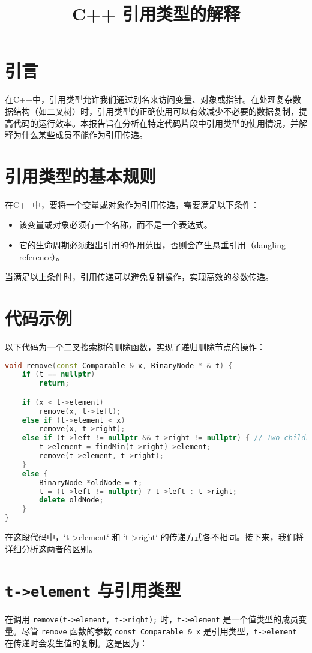 \documentclass{article}
\title{C++ 引用类型的解释}
\author{}
\date{}
\begin{document}
\maketitle

\section{引言}
在C++中，引用类型允许我们通过别名来访问变量、对象或指针。在处理复杂数据结构（如二叉树）时，引用类型的正确使用可以有效减少不必要的数据复制，提高代码的运行效率。本报告旨在分析在特定代码片段中引用类型的使用情况，并解释为什么某些成员不能作为引用传递。

\section{引用类型的基本规则}
在C++中，要将一个变量或对象作为引用传递，需要满足以下条件：

\begin{itemize}
    \item 该变量或对象必须有一个名称，而不是一个表达式。
    \item 它的生命周期必须超出引用的作用范围，否则会产生悬垂引用（dangling reference）。
\end{itemize}

当满足以上条件时，引用传递可以避免复制操作，实现高效的参数传递。

\section{代码示例}
以下代码为一个二叉搜索树的删除函数，实现了递归删除节点的操作：

\begin{lstlisting}[language=C++]
void remove(const Comparable & x, BinaryNode * & t) {
    if (t == nullptr)
        return;

    if (x < t->element)
        remove(x, t->left);
    else if (t->element < x)
        remove(x, t->right);
    else if (t->left != nullptr && t->right != nullptr) { // Two children
        t->element = findMin(t->right)->element;
        remove(t->element, t->right);
    }
    else {
        BinaryNode *oldNode = t;
        t = (t->left != nullptr) ? t->left : t->right;
        delete oldNode;
    }
}
\end{lstlisting}

在这段代码中，`t->element` 和 `t->right` 的传递方式各不相同。接下来，我们将详细分析这两者的区别。

\section{\texttt{t->element} 与引用类型}
在调用 \texttt{remove(t->element, t->right);} 时，\texttt{t->element} 是一个值类型的成员变量。尽管 \texttt{remove} 函数的参数 \texttt{const Comparable \& x} 是引用类型，\texttt{t->element} 在传递时会发生值的复制。这是因为：
\end{document}
